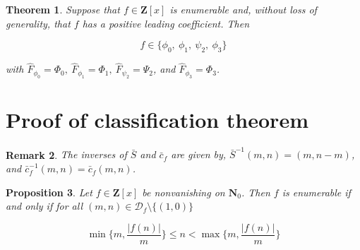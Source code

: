 \documentclass{article}
\newtheorem{theorem}{Theorem}[section]   %
\newtheorem{proposition}[theorem]{Proposition}  %
\newtheorem{remark}[theorem]{Remark}  %
\begin{document}
\begin{theorem}\label{main}
Suppose that $f \in \mathbf{Z}[x]$ is enumerable and, without loss of generality, that $f$ has a positive leading coefficient. Then

$$f \in \{\phi_0, \ \phi_1, \ \psi_2, \ \phi_3 \}$$

with $\hat{F}_{\phi_0} = \Phi_0, \ \hat{F}_{\phi_1} = \Phi_1, \ \hat{F}_{\psi_2} = \Psi_2$,  and  $\hat{F}_{\phi_3} = \Phi_3$.
\end{theorem}

\section{Proof of classification theorem}\label{section_class_proof}

\begin{remark}
The inverses of $\bar{S}$ and $\bar{c}_f$ are given by, $\bar{S}^{-1}(m,n) = (m, n-m)$, and $\bar{c}_f^{-1}(m, n) = \bar{c}_f(m, n)$.
\end{remark}

\begin{proposition}\label{maincondition}
Let $f \in \mathbf{Z}[x]$ be nonvanishing on $\mathbf{N}_0$. Then $f$ is enumerable if and only if for all $(m, n) \in \mathcal{D}_f \setminus \{(1, 0) \}$

$$\min \{m, \frac{|f(n)|}{m} \} \leq n < \max \{m, \frac{|f(n)|}{m} \}$$

\end{proposition}
\end{document}

